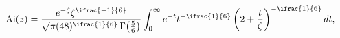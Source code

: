 \[\mathop{\mathrm{Ai}\/}\nolimits\!\left(z\right)=\frac{e^{-\zeta}\zeta^{\ifrac{%
-1}{6}}}{\sqrt{\pi}(48)^{\ifrac{1}{6}}\mathop{\Gamma\/}\nolimits\!\left(\frac{%
5}{6}\right)}\int_{0}^{\infty}e^{-t}t^{-\ifrac{1}{6}}\left(2+\frac{t}{\zeta}%
\right)^{-\ifrac{1}{6}}dt,\]